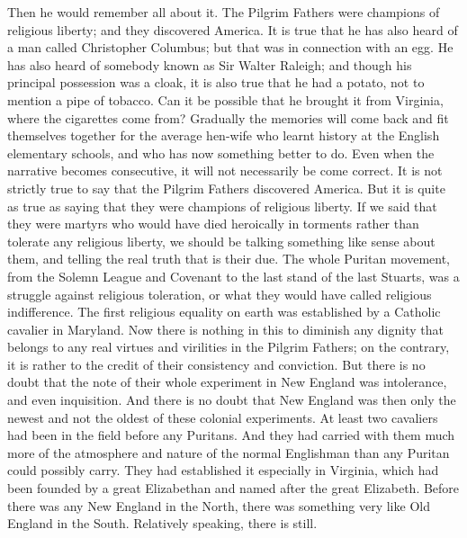 \documentclass{book}
\begin{document}
Then he would remember all about it. The Pilgrim Fathers were champions of religious liberty; and they discovered America. It is true that he has also heard of a man called Christopher Columbus; but that was in connection with an egg. He has also heard of somebody known as Sir Walter Raleigh; and though his principal possession was a cloak, it is also true that he had a potato, not to mention a pipe of tobacco. Can it be possible that he brought it from Virginia, where the cigarettes come from? Gradually the memories will come back and fit themselves together for the average hen-wife who learnt history at the English elementary schools, and who has now something better to do. Even when the narrative becomes consecutive, it will not necessarily be come correct. It is not strictly true to say that the Pilgrim Fathers discovered America. But it is quite as true as saying that they were champions of religious liberty. If we said that they were martyrs who would have died heroically in torments rather than tolerate any religious liberty, we should be talking something like sense about them, and telling the real truth that is their due. The whole Puritan movement, from the Solemn League and Covenant to the last stand of the last Stuarts, was a struggle against religious toleration, or what they would have called religious indifference. The first religious equality on earth was established by a Catholic cavalier in Maryland. Now there is nothing in this to diminish any dignity that belongs to any real virtues and virilities in the Pilgrim Fathers; on the contrary, it is rather to the credit of their consistency and conviction. But there is no doubt that the note of their whole experiment in New England was intolerance, and even inquisition. And there is no doubt that New England was then only the newest and not the oldest of these colonial experiments. At least two cavaliers had been in the field before any Puritans. And they had carried with them much more of the atmosphere and nature of the normal Englishman than any Puritan could possibly carry. They had established it especially in Virginia, which had been founded by a great Elizabethan and named after the great Elizabeth. Before there was any New England in the North, there was something very like Old England in the South. Relatively speaking, there is still.
\end{document}
